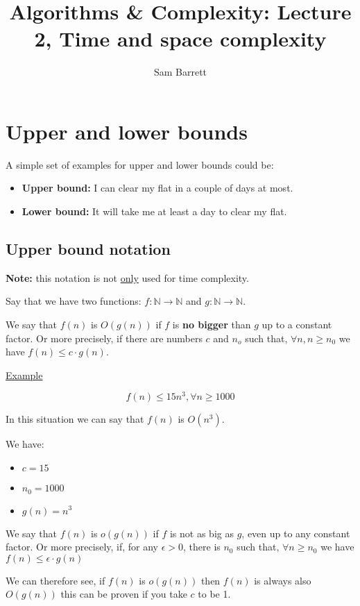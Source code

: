 \documentclass{article}
\title{Algorithms \& Complexity: Lecture 2, Time and space complexity}
\author{Sam Barrett}
\newcommand{\N}{\mathbb{N}}
\begin{document}
\maketitle

\section{Upper and lower bounds}

A simple set of examples for upper and lower bounds could be:

\begin{itemize}
  \item \textbf{Upper bound:} I can clear my flat in a couple of days at most.
  \item \textbf{Lower bound:} It will take me at least a day to clear my flat.
\end{itemize}

\subsection{Upper bound notation}

\textbf{Note:} this notation is not \underline{only} used for time complexity.

Say that we have two functions: $f: \N \rightarrow \N$ and $ g: \N \rightarrow \N$.

We say that $f(n)$ is $O(g(n))$ if $f$ is \textbf{no bigger} than $g$ up to a constant factor. Or more precisely, if there are numbers $c$ and $n_{o}$ such that, $\forall n, n \geq n_{0}$ we have $f(n) \leq c \cdot g(n)$.

\underline{Example}

\[
  f(n) \leq 15n^{3}, \forall n \geq 1000
\]

In this situation we can say that $f(n)$ is $O(n^{3})$.

We have:
\begin{itemize}
  \item $c =15$
  \item $n_{0} = 1000$
  \item $g(n) = n^{3}$
\end{itemize}


We say that $f(n)$ is $o(g(n))$ if $f$ is not as big as $g$, even up to any constant factor. Or more precisely, if, for any $\epsilon > 0$, there is $n_{0}$ such that, $\forall n \geq n_{0} $ we have $f(n) \leq \epsilon \cdot g(n)$

We can therefore see, if $f(n)$ is $o(g(n))$ then $f(n)$ is always also $O(g(n))$ this can be proven if you take $c$ to be 1.
\end{document}
